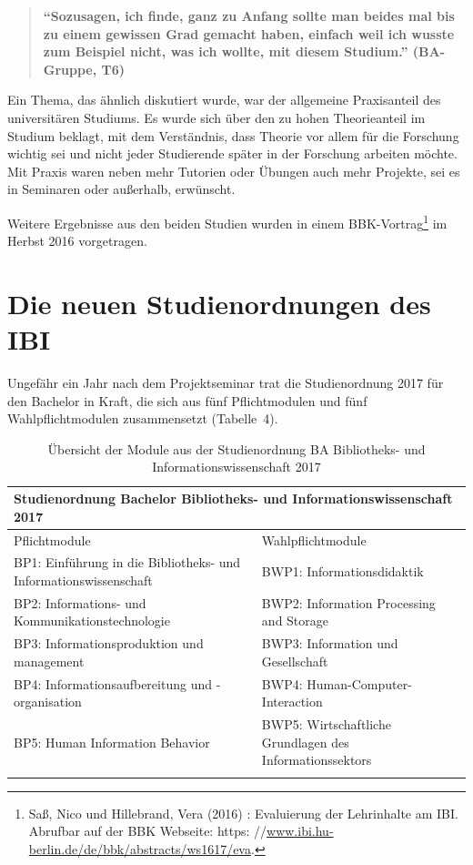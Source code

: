 \documentclass[a4paper,
fontsize=11pt,
oneside,
numbers=noperiodatend,
parskip=half-,
bibliography=totoc,
final
]{scrartcl}
\begin{document}
\begin{quote}
\textbf{\enquote{Sozusagen, ich finde, ganz zu Anfang sollte man beides
mal bis zu einem gewissen Grad gemacht haben, einfach weil ich wusste
zum Beispiel nicht, was ich wollte, mit diesem Studium.} (BA-Gruppe,
T6)}
\end{quote}

Ein Thema, das ähnlich diskutiert wurde, war der allgemeine Praxisanteil
des universitären Studiums. Es wurde sich über den zu hohen
Theorieanteil im Studium beklagt, mit dem Verständnis, dass Theorie vor
allem für die Forschung wichtig sei und nicht jeder Studierende später
in der Forschung arbeiten möchte. Mit Praxis waren neben mehr Tutorien
oder Übungen auch mehr Projekte, sei es in Seminaren oder außerhalb,
erwünscht.

Weitere Ergebnisse aus den beiden Studien wurden in einem
BBK-Vortrag\footnote{Saß, Nico und Hillebrand, Vera (2016) : Evaluierung
  der Lehrinhalte am IBI. Abrufbar auf der BBK Webseite: https:
  //\href{http://www.ibi.hu-berlin.de/de/bbk/abstracts/ws1617/eva}{www.ibi.hu-berlin.de/de/bbk/abstracts/ws1617/eva}.}
im Herbst 2016 vorgetragen.


\section{Die neuen Studienordnungen des IBI}

Ungefähr ein Jahr nach dem Projektseminar trat die Studienordnung 2017
für den Bachelor in Kraft, die sich aus fünf Pflichtmodulen und fünf
Wahlpflichtmodulen zusammensetzt (Tabelle~4).

\begin{longtable}[]{@{}p{8cm}p{8cm}@{}}
\toprule
\multicolumn{2}{l}{\textbf{Studienordnung Bachelor Bibliotheks- und Informationswissenschaft 2017}} \tabularnewline
\midrule
\endhead
Pflichtmodule & Wahlpflichtmodule\tabularnewline
\midrule
BP1: Einführung in die Bibliotheks- und Informationswissenschaft & BWP1:
Informationsdidaktik\tabularnewline
BP2: Informations- und Kommunikationstechnologie & BWP2: Information
Processing and Storage\tabularnewline
BP3: Informationsproduktion und \-manage\-ment & BWP3: Information und
Gesellschaft\tabularnewline
BP4: Informationsaufbereitung und -organi\-sation & BWP4:
Human-Computer-Interaction\tabularnewline
BP5: Human Information Behavior & BWP5: Wirtschaftliche Grundlagen des
Informationssektors\tabularnewline
\bottomrule
\caption{Übersicht der Module aus der Studienordnung BA Bibliotheks-
und Informationswissenschaft 2017}
\end{longtable}
\end{document}
